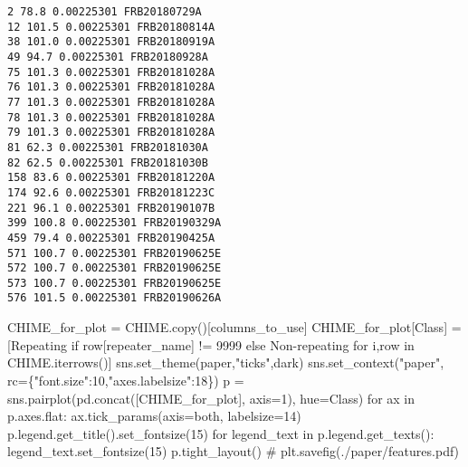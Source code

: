 \documentclass[
  letterpaper,
  DIV=11,
  numbers=noendperiod]{scrartcl}
\newenvironment{Shaded}{\begin{snugshade}}{\end{snugshade}}
\newcommand{\CommentTok}[1]{\textcolor[rgb]{0.37,0.37,0.37}{#1}}
\newcommand{\ControlFlowTok}[1]{\textcolor[rgb]{0.00,0.23,0.31}{#1}}
\newcommand{\DecValTok}[1]{\textcolor[rgb]{0.68,0.00,0.00}{#1}}
\newcommand{\KeywordTok}[1]{\textcolor[rgb]{0.00,0.23,0.31}{#1}}
\newcommand{\NormalTok}[1]{\textcolor[rgb]{0.00,0.23,0.31}{#1}}
\newcommand{\OperatorTok}[1]{\textcolor[rgb]{0.37,0.37,0.37}{#1}}
\newcommand{\StringTok}[1]{\textcolor[rgb]{0.13,0.47,0.30}{#1}}
\begin{document}
\begin{verbatim}
2 78.8 0.00225301 FRB20180729A
12 101.5 0.00225301 FRB20180814A
38 101.0 0.00225301 FRB20180919A
49 94.7 0.00225301 FRB20180928A
75 101.3 0.00225301 FRB20181028A
76 101.3 0.00225301 FRB20181028A
77 101.3 0.00225301 FRB20181028A
78 101.3 0.00225301 FRB20181028A
79 101.3 0.00225301 FRB20181028A
81 62.3 0.00225301 FRB20181030A
82 62.5 0.00225301 FRB20181030B
158 83.6 0.00225301 FRB20181220A
174 92.6 0.00225301 FRB20181223C
221 96.1 0.00225301 FRB20190107B
399 100.8 0.00225301 FRB20190329A
459 79.4 0.00225301 FRB20190425A
571 100.7 0.00225301 FRB20190625E
572 100.7 0.00225301 FRB20190625E
573 100.7 0.00225301 FRB20190625E
576 101.5 0.00225301 FRB20190626A
\end{verbatim}

\begin{Shaded}
\begin{Highlighting}[]
\NormalTok{CHIME\_for\_plot }\OperatorTok{=}\NormalTok{ CHIME.copy()[columns\_to\_use]}
\NormalTok{CHIME\_for\_plot[}\StringTok{\textquotesingle{}Class\textquotesingle{}}\NormalTok{] }\OperatorTok{=}\NormalTok{ [}\StringTok{\textquotesingle{}Repeating\textquotesingle{}} \ControlFlowTok{if}\NormalTok{ row[}\StringTok{\textquotesingle{}repeater\_name\textquotesingle{}}\NormalTok{] }\OperatorTok{!=} \StringTok{\textquotesingle{}{-}9999\textquotesingle{}} \ControlFlowTok{else} \StringTok{\textquotesingle{}Non{-}repeating\textquotesingle{}} \ControlFlowTok{for}\NormalTok{ i,row }\KeywordTok{in}\NormalTok{ CHIME.iterrows()]}
\NormalTok{sns.set\_theme(}\StringTok{\textquotesingle{}paper\textquotesingle{}}\NormalTok{,}\StringTok{"ticks"}\NormalTok{,}\StringTok{\textquotesingle{}dark\textquotesingle{}}\NormalTok{)}
\NormalTok{sns.set\_context(}\StringTok{"paper"}\NormalTok{, rc}\OperatorTok{=}\NormalTok{\{}\StringTok{"font.size"}\NormalTok{:}\DecValTok{10}\NormalTok{,}\StringTok{"axes.labelsize"}\NormalTok{:}\DecValTok{18}\NormalTok{\})}
\NormalTok{p }\OperatorTok{=}\NormalTok{ sns.pairplot(pd.concat([CHIME\_for\_plot], axis}\OperatorTok{=}\DecValTok{1}\NormalTok{), hue}\OperatorTok{=}\StringTok{\textquotesingle{}Class\textquotesingle{}}\NormalTok{)}
\ControlFlowTok{for}\NormalTok{ ax }\KeywordTok{in}\NormalTok{ p.axes.flat:}
\NormalTok{    ax.tick\_params(axis}\OperatorTok{=}\StringTok{\textquotesingle{}both\textquotesingle{}}\NormalTok{, labelsize}\OperatorTok{=}\DecValTok{14}\NormalTok{)}
\NormalTok{p.legend.get\_title().set\_fontsize(}\DecValTok{15}\NormalTok{)}
\ControlFlowTok{for}\NormalTok{ legend\_text }\KeywordTok{in}\NormalTok{ p.legend.get\_texts():}
\NormalTok{    legend\_text.set\_fontsize(}\DecValTok{15}\NormalTok{)}
\NormalTok{p.tight\_layout()}
\CommentTok{\# plt.savefig(\textquotesingle{}./paper/features.pdf\textquotesingle{})}
\end{Highlighting}
\end{Shaded}
\end{document}
